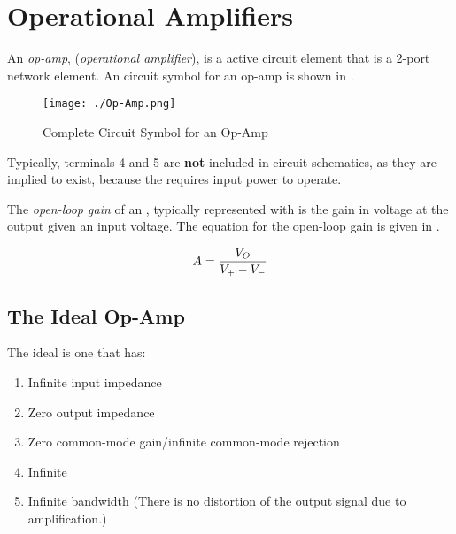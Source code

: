 \section{Operational Amplifiers}\label{sec:Op-Amps}
\begin{definition}[Op-Amp]\label{def:Op-Amp}
  An \emph{op-amp}, (\emph{operational amplifier}), is a active circuit element that is a 2-port network element.
  An circuit symbol for an op-amp is shown in .
\end{definition}

\begin{figure}[h!tbp]
  \centering
  \texttt{[image: ./Op-Amp.png]}
  \caption{Complete Circuit Symbol for an Op-Amp \parencite[p.~60]{sedraTextbook7}}
  \label{fig:Op-Amp}
\end{figure}

Typically, terminals 4 and 5 are \textbf{not} included in circuit schematics, as they are implied to exist, because the  requires input power to operate.

\begin{definition}\label{def:Open-Loop_Gain}
  The \emph{open-loop gain} of an , typically represented with \OpenLoopGain{} is the gain in voltage at the output given an input voltage.
  The equation for the open-loop gain is given in .

  \begin{equation}\label{eq:Open-Loop_Gain}
    A = \frac{V_{O}}{V_{+} - V_{-}}
  \end{equation}
\end{definition}

\subsection{The Ideal Op-Amp}\label{subsec:Ideal_Op-Amp}
The ideal  is one that has:
\begin{enumerate}[noitemsep]
\item Infinite input impedance
\item Zero output impedance
\item Zero common-mode gain/infinite common-mode rejection
\item Infinite 
\item Infinite bandwidth (There is no distortion of the output signal due to amplification.)
\end{enumerate}

